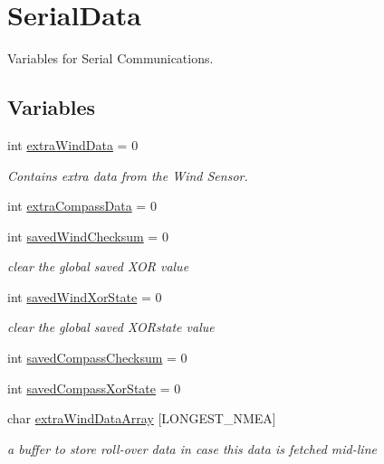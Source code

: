 \hypertarget{group__group1}{
\section{\-Serial\-Data}
\label{group__group1}
}


\-Variables for \-Serial \-Communications.  


\subsection*{\-Variables}
\begin{DoxyCompactItemize}
\item 
int \hyperlink{group__group1_gaf9d919ceea98cf74d8ee327ca87871ee}{extra\-Wind\-Data} = 0
\begin{DoxyCompactList}\small\item\em \-Contains extra data from the \-Wind \-Sensor. \end{DoxyCompactList}\item 
int \hyperlink{group__group1_gaafded9aee7842e71393cafc5ac68d921}{extra\-Compass\-Data} = 0
\item 
int \hyperlink{group__group1_gaf7ce3159cdebccf941f8db4e70f5764e}{saved\-Wind\-Checksum} = 0
\begin{DoxyCompactList}\small\item\em clear the global saved \-X\-O\-R value \end{DoxyCompactList}\item 
int \hyperlink{group__group1_gabc070e9e6f6449471852bd233593d1d2}{saved\-Wind\-Xor\-State} = 0
\begin{DoxyCompactList}\small\item\em clear the global saved \-X\-O\-Rstate value \end{DoxyCompactList}\item 
int \hyperlink{group__group1_ga6e28e651127135816788318d7b473dc8}{saved\-Compass\-Checksum} = 0
\item 
int \hyperlink{group__group1_ga766482b676879097212dc7aba1450aa0}{saved\-Compass\-Xor\-State} = 0
\item 
char \hyperlink{group__group1_ga5a0e345949d7a23900298d33d0be150c}{extra\-Wind\-Data\-Array} \mbox{[}\-L\-O\-N\-G\-E\-S\-T\-\_\-\-N\-M\-E\-A\mbox{]}
\begin{DoxyCompactList}\small\item\em a buffer to store roll-\/over data in case this data is fetched mid-\/line \end{DoxyCompactList}\item 

\end{DoxyCompactItemize}
